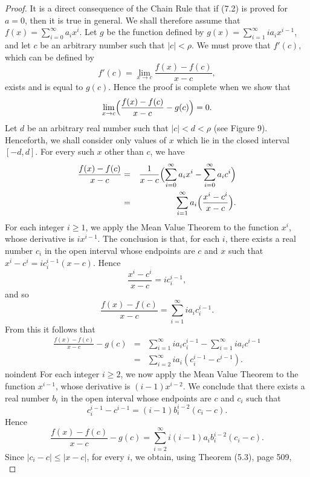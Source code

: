 \begin{proof}
It is a direct consequence of the Chain Rule that if (7.2) is proved for $a = 0$, then it is true in general. We shall therefore assume that $f(x) = \sum_{i=0}^\infty a_ix^i$. Let $g$ be the function defined by $g(x) = \sum_{i=1}^\infty i a_i x^{i-1}$, and let $c$ be an arbitrary number such that $|c| < \rho$. We must prove that $f'(c)$, which can be defined by
$$
f'(c) = \lim_{x \rightarrow c} \frac{f(x)- f(c)}{x - c} ,
$$
exists and is equal to $g(c)$. Hence the proof is complete when we show that 
\begin{equation}
 \lim_{x \rightarrow c} \Bigl(\frac{f(x) - f(c)}{x-c} - g(c)\Bigr) = 0.
\label{eq9.7.2}
\end{equation}
Let $d$ be an arbitrary real number such that $|c| < d < \rho$ (see Figure 9).
Henceforth, we shall consider only values of $x$ which lie in the closed interval $[-d, d]$. For every such $x$ other than $c$, we have
\begin{eqnarray*}
\frac{f(x) - f(c)}{x-c} 
&=& \frac{1}{x - c} \Bigl(\sum_{i=0}^\infty a_i x^i  - \sum_{i=0}^\infty a_i c^i\Bigr)\\
&=& \sum_{i=1}^\infty a_i \Bigl(\frac{x^i - c^i}{x-c} \Bigl).
\end{eqnarray*}
For each integer $i \geq 1$, we apply the Mean Value Theorem to the function $x^i$, whose derivative is $ix^{i-1}$. The conclusion is that, for each $i$, there exists a real number $c_i$ in the open interval whose endpoints are $c$ and $x$ such that $x^i - c^i = ic_{i}^{i-1}(x-c)$. Hence
$$
\frac{x^i - c^i}{x-c} = ic_i^{i-1} ,
$$
and so
$$
\frac{f(x) - f(c)}{x - c} = \sum_{i=1}^\infty ia_i c_i^{i-1} .
$$
From this it follows that
\begin{eqnarray*}
\frac{f(x) - f(c)}{x - c} - g(c) 
&=& \sum_{i=1}^\infty ia_ic_i^{i -1} - \sum_{i=1}^\infty ia_i c^{i -1} \\
&=& \sum_{i=2}^\infty ia_i(c_i^{i -1} - c^{i-1}).
\end{eqnarray*}
noindent For each integer $i \geq 2$, we now apply the Mean Value Theorem to the function $x^{i-1}$, whose derivative is $(i-1)x^{i-2}$. We conclude that there exists a real number $b_i$ in the open interval whose endpoints are $c$ and $c_i$ such that 
$$
c_i^{i-1} - c^{i-1} = (i- 1)b_i^{i-2}(c_i - c).
$$
Hence
$$
\frac{f(x) - f(c)}{x-c} - g(c) = \sum_{i=2}^\infty i(i-1 )a_i b_i^{i-2} (c_i - c).
$$
Since $|c_i-c| \leq |x-c|$, for every $i$, we obtain, using Theorem (5.3), page 509,
\begin{equation}

\end{equation}
\end{proof}

